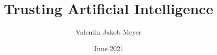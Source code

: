 \documentclass[12pt, a4paper]{article}
\title{Trusting Artificial Intelligence}      %
\author{Valentin Jakob Meyer}               %
\date{June 2021}
\newcommand\BackgroundPic{%
    \put(0,0){%
    \parbox[b][\paperheight]{\paperwidth}{%
    \vfill
    \texttt{[image: backgroundsealwatermark.png]}%
    \vfill
    }}}
\begin{document}

    \begin{comment}     %
    General purpose/considerations/goals\\
    	Summarize the paper and conduct a critical review 
        Boil down complex arguments/lines of thought, give the intuitions and explain the context 
        Carve out the methodological approach and clearly describe the practical implications
                
        All statements/claims (relevant for your paper) need to be justified 
        	They have to be supported by arguments 
           	Just listing sources that support the claim is insufficient
           	Introduce equations/assumptions in an order that allows them to build on oneanother
           	    Basic to specific
           	
        Write, as if your audience were fellow Economics students
\end{comment}
\end{document}
